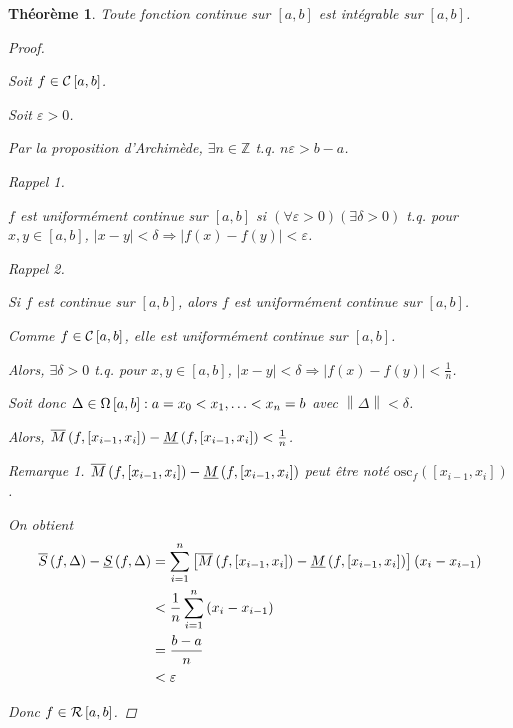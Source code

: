 \documentclass{report}
\newcommand*{\norme}[1]{\left\| #1 \right\|}
\newcommand*{\abs}[1]{\left| #1 \right|}
\newcommand*{\eps}{\varepsilon}
\newcommand*{\entiers}{\mathbb{Z}}
\newtheorem*{thm}{Th\'eor\`eme}
\theoremstyle{definition}
\theoremstyle{remark}
\newtheorem*{rema}{Remarque}
\newtheorem*{rapp}{Rappel}
\begin{document}
	\begin{thm}
		Toute fonction continue sur $[a,b]$ est int\'egrable sur $[a,b]$.
		\begin{proof}~

			Soit $f \in \continue$.

			Soit $\eps>0$.

			Par la proposition d'Archim\`ede, $\exists n\in\entiers$ t.q. $n\eps>b-a$.

			\begin{rapp}~

				$f$ est uniform\'ement continue sur $[a,b]$ si $\left( \forall\eps>0 \right) \left( \exists\delta>0 \right)$ t.q. pour $x,y \in [a,b]$, $\abs{x-y}<\delta \Rightarrow \abs{f(x)-f(y)}<\eps$.
			\end{rapp}
			\begin{rapp}~

				Si $f$ est continue sur $[a,b]$, alors $f$ est uniform\'ement continue sur $[a,b]$.
			\end{rapp}

			Comme $f \in \continue$, elle est uniform\'ement continue sur $[a,b]$.

			Alors, $\exists\delta>0$ t.q. pour $x,y \in [a,b]$, $\abs{x-y}<\delta \Rightarrow \abs{f(x)-f(y)}<\frac{1}{n}$.

			Soit donc $\Delta \in \partitions: a=x_0<x_1,\dotsc<x_n=b$ avec $\norme{\Delta}<\delta$.

			Alors, $\msup{f}[x_{i-1},x_i] - \minf{f}[x_{i-1},x_i]<\frac{1}{n}$.
			\begin{rema}
				$\msup{f}[x_{i-1},x_i] - \minf{f}[x_{i-1},x_i]$ peut \^etre not\'e $\mathrm{osc}_f(\left[ x_{i-1},x_i \right])$.
			\end{rema}

			On obtient
			\begin{align*}
				\ssup{f}-\sinf{f}&= \sum_{i=1}^{n}\left[ \msup{f}[x_{i-1},x_i] - \minf{f}[x_{i-1},x_i] \right] \left( x_i-x_{i-1} \right)\\
				&< \dfrac{1}{n} \sum_{i=1}^{n}\left( x_i-x_{i-1} \right)\\
				&=\dfrac{b-a}{n}\\
				&< \eps
			\end{align*}

			Donc $f \in \riemann$.
		\end{proof}
	\end{thm}
\end{document}
